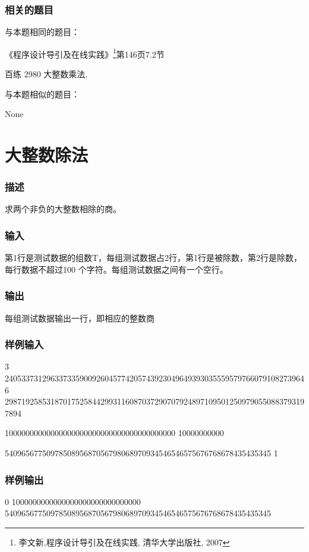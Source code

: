 \subsubsection{相关的题目}
与本题相同的题目：
\begindot
\item 《程序设计导引及在线实践》\footnote{李文新,程序设计导引及在线实践, 清华大学出版社, 2007}第146页7.2节
\item 百练 2980 大整数乘法, 
\myenddot

与本题相似的题目：
\begindot
\item  None
\myenddot


\section{大整数除法} %
\subsubsection{描述}
求两个非负的大整数相除的商。

\subsubsection{输入}
第1行是测试数据的组数T，每组测试数据占2行，第1行是被除数，第2行是除数，每行数据不超过100 个字符。每组测试数据之间有一个空行。

\subsubsection{输出}
每组测试数据输出一行，即相应的整数商

\subsubsection{样例输入}
\begin{Code}
3
2405337312963373359009260457742057439230496493930355595797660791082739646
2987192585318701752584429931160870372907079248971095012509790550883793197894

10000000000000000000000000000000000000000
10000000000

5409656775097850895687056798068970934546546575676768678435435345
1
\end{Code}

\subsubsection{样例输出}
\begin{Code}
0
1000000000000000000000000000000
5409656775097850895687056798068970934546546575676768678435435345
\end{Code}

